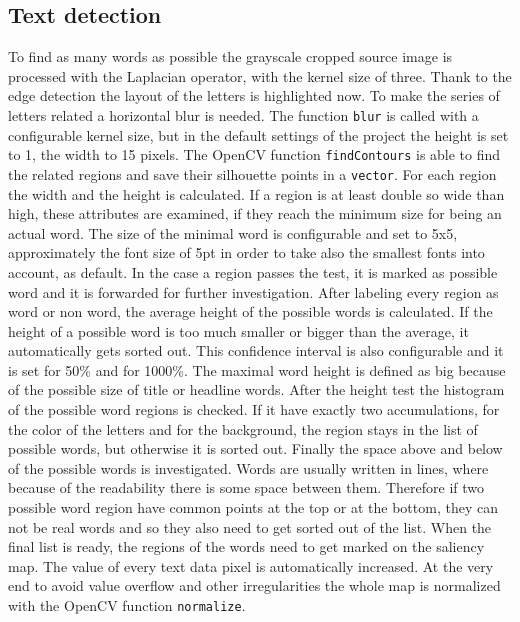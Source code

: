 \documentclass[draft,final]{vutinfth} %
\begin{document}
	\subsection{Text detection}
	To find as many words as possible the grayscale cropped source image is processed with the Laplacian operator, with the kernel size of three.
	Thank to the edge detection the layout of the letters is highlighted now.
	To make the series of letters related a horizontal blur is needed.
	The function \texttt{blur} is called with a configurable kernel size, but in the default settings of the project the height is set to 1, the width to 15 pixels.
	The OpenCV function  \texttt{findContours} is able to find the related regions and save their silhouette points in a \texttt{vector}.
	For each region the width and the height is calculated.
	If a region is at least double so wide than high, these attributes are examined, if they reach the minimum size for being an actual word.
	The size of the minimal word is configurable and set to 5x5, approximately the font size of 5pt in order to take also the smallest fonts into account, as default.
	In the case a region passes the test, it is marked as possible word and it is forwarded for further investigation.
	After labeling every region as word or non word, the average height of the possible words is calculated.
	If the height of a possible word is too much smaller or bigger than the average, it automatically gets sorted out.
	This confidence interval is also configurable and it is set for 50\% and for 1000\%. 
	The maximal word height is defined as big because of the possible size of title or headline words.
	After the height test the histogram of the possible word regions is checked.
	If it have exactly two accumulations, for the color of the letters and for the background, the region stays in the list of possible words, but otherwise it is sorted out.
	Finally the space above and below of the possible words is investigated.
	Words are usually written in lines, where because of the readability there is some space between them.
	Therefore if two possible word region have common points at the top or at the bottom, they can not be real words and so they also need to get sorted out of the list.
	When the final list is ready, the regions of the words need to get marked on the saliency map.
	The value of every text data pixel is automatically increased.
	At the very end to avoid value overflow and other irregularities the whole map is normalized with the OpenCV function \texttt{normalize}.  
	
\end{document}

